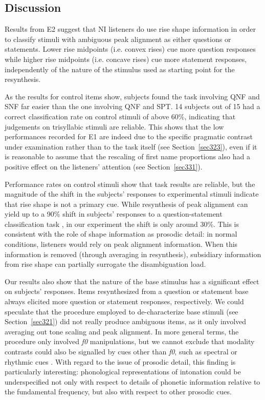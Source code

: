 \subsection{Discussion}\label{sec333}
Results from E2 suggest that NI listeners do use rise shape information in order to classify stimuli with ambiguous peak alignment as either questions or statements. Lower rise midpoints (i.e. convex rises) cue more question responses while higher rise midpoints (i.e. concave rises) cue more statement responses, independently of the nature of the stimulus used as starting point for the resynthesis.

As the results for control items show, subjects found the task involving QNF and SNF far easier than the one involving QNF and SPT. 14 subjects out of 15 had a correct classification rate on control stimuli of above 60\%, indicating that judgements on trisyllabic stimuli are reliable. This shows that the low performances recorded for E1 are indeed due to the specific pragmatic contrast under examination rather than to the task itself (see Section~\ref{sec323}), even if it is reasonable to assume that the rescaling of first name proportions also had a positive effect on the listeners' attention (see Section~\ref{sec331}).

Performance rates on control stimuli show that task results are reliable, but the magnitude of the shift in the subjects' responses to experimental stimuli indicate that rise shape is not a primary cue. While resynthesis of peak alignment can yield up to a 90\% shift in subjects' responses to a question-statement classification task \citep[§3, among others]{dimperio2000role}, in our experiment the shift is only around 30\%. This is consistent with the role of shape information as prosodic detail: in normal conditions, listeners would rely on peak alignment information. When this information is removed (through averaging in resynthesis), subsidiary information from rise shape can partially surrogate the disambiguation load.

Our results also show that the nature of the base stimulus has a significant effect on subjects' responses. Items resynthesized from a question or statement base always elicited more question or statement responses, respectively. We could speculate that the procedure employed to de-characterize base stimuli (see Section~\ref{sec321}) did not really produce ambiguous items, as it only involved averaging out tone scaling and peak alignment. In more general terms, the procedure only involved \textit{f0} manipulations, but we cannot exclude that modality contrasts could also be signalled by cues other than \textit{f0}, such as spectral or rhythmic cues \citep[§5, among others]{niebuhr2010pitchaccent,dimperio2000role}. With regard to the issue of prosodic detail, this finding is particularly interesting: phonological representations of intonation could be underspecified not only with respect to details of phonetic information relative to the fundamental frequency, but also with respect to other prosodic cues.

